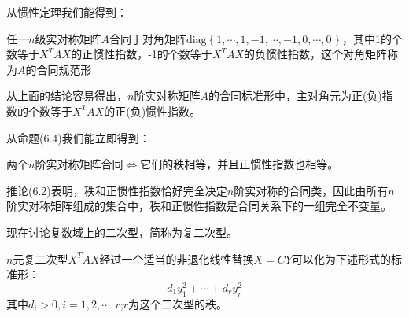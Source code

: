 \documentclass[lang=cn,10pt]{elegantbook}
\begin{document}
从惯性定理我们能得到：

\begin{corollary}
	任一$n$级实对称矩阵$A$合同于对角矩阵$\mathrm{diag}\left\{ 1,\cdots ,1,-1,\cdots ,-1,0,\cdots ,0_{} \right\} $，其中1的个数等于$X^{T}AX$的正惯性指数，-1的个数等于$X^{T}AX$的负惯性指数，这个对角矩阵称为$A$的合同规范形
\end{corollary}

从上面的结论容易得出，$n$阶实对称矩阵$A$的合同标准形中，主对角元为正(负)指数的个数等于$X^{T}AX$的正(负)惯性指数。

从命题(6.4)我们能立即得到：

\begin{corollary}
	两个$n$阶实对称矩阵合同$\Longleftrightarrow $它们的秩相等，并且正惯性指数也相等。
\end{corollary}

推论(6.2)表明，秩和正惯性指数恰好完全决定$n$阶实对称的合同类，因此由所有$n$阶实对称矩阵组成的集合中，秩和正惯性指数是合同关系下的一组完全不变量。

现在讨论复数域上的二次型，简称为复二次型。

$n$元复二次型$X^{T}AX$经过一个适当的非退化线性替换$X=CY$可以化为下述形式的标准形：
\begin{equation}
	d_{1}y^{2}_{1}+\cdots+d_{r}y^{2}_{r}
\end{equation}
其中$d_{i}>0,i=1,2,\cdots,r$;$r$为这个二次型的秩。
\end{document}
